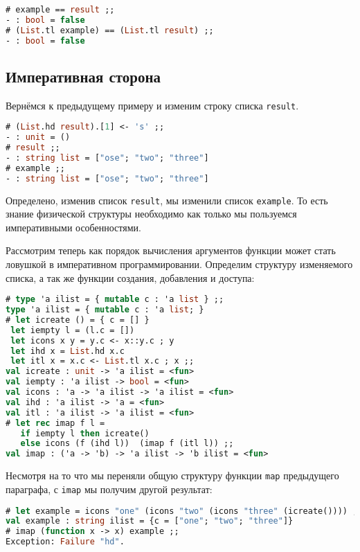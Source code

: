 \begin{lstlisting}[language=OCaml]
# example == result ;;
- : bool = false
# (List.tl example) == (List.tl result) ;;
- : bool = false
\end{lstlisting}

\subsection{Императивная сторона}
\label{subsec:the_imperative_side}

Вернёмся к предыдущему примеру и изменим строку списка \texttt{result}.

\begin{lstlisting}[language=OCaml]
# (List.hd result).[1] <- 's' ;;
- : unit = ()
# result ;;
- : string list = ["ose"; "two"; "three"]
# example ;;
- : string list = ["ose"; "two"; "three"]
\end{lstlisting}

Определено, изменив список \texttt{result}, мы изменили список \texttt{example}.
То есть знание физической структуры необходимо как только мы пользуемся
императивными особенностями.

Рассмотрим теперь как порядок вычисления аргументов функции может стать ловушкой
в императивном программировании. Определим структуру изменяемого списка, а так
же функции создания, добавления и доступа:

\begin{lstlisting}[language=OCaml]
# type 'a ilist = { mutable c : 'a list } ;;
type 'a ilist = { mutable c : 'a list; }
# let icreate () = { c = [] }
 let iempty l = (l.c = [])
 let icons x y = y.c <- x::y.c ; y
 let ihd x = List.hd x.c
 let itl x = x.c <- List.tl x.c ; x ;;
val icreate : unit -> 'a ilist = <fun>
val iempty : 'a ilist -> bool = <fun>
val icons : 'a -> 'a ilist -> 'a ilist = <fun>
val ihd : 'a ilist -> 'a = <fun>
val itl : 'a ilist -> 'a ilist = <fun>
# let rec imap f l =
   if iempty l then icreate()
   else icons (f (ihd l))  (imap f (itl l)) ;;
val imap : ('a -> 'b) -> 'a ilist -> 'b ilist = <fun>
\end{lstlisting}

Несмотря на то что мы переняли общую структуру функции \texttt{map} предыдущего
параграфа, с \texttt{imap} мы получим другой результат:

\begin{lstlisting}[language=OCaml]
# let example = icons "one" (icons "two" (icons "three" (icreate()))) ;;
val example : string ilist = {c = ["one"; "two"; "three"]}
# imap (function x -> x) example ;;
Exception: Failure "hd".
\end{lstlisting}

